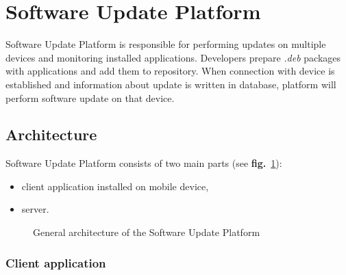 \section{Software Update Platform}

Software Update Platform is responsible for performing updates on multiple devices and monitoring
installed applications. Developers prepare \emph{.deb} packages with applications and add them to
repository. When connection with device is established and information about update is written in
database, platform will perform software update on that device.


\subsection{Architecture}

Software Update Platform consists of two main parts (see \textbf{fig.}~\ref{fig:architecture}):
\begin{itemize}
  \item client application installed on mobile device,
  \item server.
\end{itemize}

\begin{figure}[htbp]
  \centering
    \caption{General architecture of the Software Update Platform}
    \label{fig:architecture}
\end{figure}

\subsubsection*{Client application}

